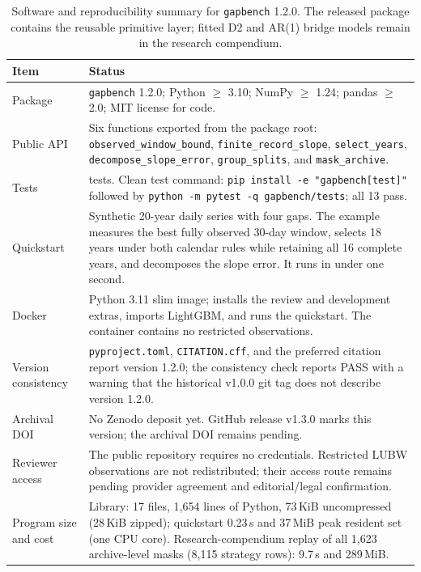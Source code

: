 \begin{table}[p]
\centering
\footnotesize
\renewcommand{\arraystretch}{0.95}
\caption{Software and reproducibility summary for \texttt{gapbench} 1.2.0. The released package contains the reusable primitive layer; fitted D2 and AR(1) bridge models remain in the research compendium.}
\label{tab:S10}
\begin{tabular}{>{\raggedright\arraybackslash}p{}>{\raggedright\arraybackslash}p{}}
\toprule
Item & Status \\
\midrule
Package & \texttt{gapbench} 1.2.0; Python $\ge$ 3.10; NumPy $\ge$ 1.24; pandas $\ge$ 2.0; MIT license for code. \\
Public API & Six functions exported from the package root: \texttt{observed\_window\_bound}, \texttt{finite\_record\_slope}, \texttt{select\_years}, \texttt{decompose\_slope\_error}, \texttt{group\_splits}, and \texttt{mask\_archive}. \\
Tests & 13 tests. Clean test command: \texttt{pip install -e "gapbench[test]"} followed by \texttt{python -m pytest -q gapbench/tests}; all 13 pass. \\
Quickstart & Synthetic 20-year daily series with four gaps. The example measures the best fully observed 30-day window, selects 18 years under both calendar rules while retaining all 16 complete years, and decomposes the slope error. It runs in under one second. \\
Docker & Python 3.11 slim image; installs the review and development extras, imports LightGBM, and runs the quickstart. The container contains no restricted observations. \\
Version consistency & \texttt{pyproject.toml}, \texttt{CITATION.cff}, and the preferred citation report version 1.2.0; the consistency check reports PASS with a warning that the historical v1.0.0 git tag does not describe version 1.2.0. \\
Archival DOI & No Zenodo deposit yet. GitHub release v1.3.0 marks this version; the archival DOI remains pending. \\
Reviewer access & The public repository requires no credentials. Restricted LUBW observations are not redistributed; their access route remains pending provider agreement and editorial/legal confirmation. \\
Program size and cost & Library: 17 files, 1{,}654 lines of Python, 73\,KiB uncompressed (28\,KiB zipped); quickstart 0.23\,s and 37\,MiB peak resident set (one CPU core). Research-compendium replay of all 1{,}623 archive-level masks (8{,}115 strategy rows): 9.7\,s and 289\,MiB. \\

\end{tabular}
\end{table}

